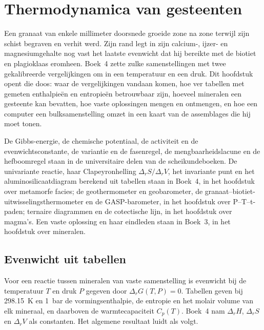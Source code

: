 \chapter{Thermodynamica van gesteenten}\label{ch:b3:petrological-thermodynamics}

Een granaat van enkele millimeter doorsnede groeide zone na zone terwijl zijn schist
begraven en verhit werd. Zijn rand legt in zijn calcium-, ijzer- en magnesiumgehalte
nog vast het laatste evenwicht dat hij bereikte met de biotiet en plagioklaas eromheen.
Boek~4 zette zulke samenstellingen met twee gekalibreerde vergelijkingen om in een
temperatuur en een druk. Dit hoofdstuk opent die doos: waar de vergelijkingen vandaan
komen, hoe ver tabellen met gemeten enthalpieën en entropieën betrouwbaar zijn, hoeveel
mineralen een gesteente kan bevatten, hoe vaste oplossingen mengen en ontmengen, en
hoe een computer een bulksamenstelling omzet in een kaart van de assemblages
die hij moet tonen.

\begin{recall}
De Gibbs-energie, de chemische potentiaal, de activiteit en de
evenwichtsconstante, de variantie en de fasenregel, de mengbaarheidslacune en de
hefboomregel staan in de universitaire delen van de scheikundeboeken. De univariante
reactie, haar Clapeyronhelling $\Delta_rS/\Delta_rV$, het invariante punt en het
aluminosilicaatdiagram berekend uit tabellen staan in Boek~4, in het hoofdstuk over
metamorfe facies; de geothermometer en geobarometer, de
granaat--biotiet-uitwisselingsthermometer en de GASP-barometer, in het hoofdstuk over
P--T--t-paden; ternaire diagrammen en de cotectische lijn, in het hoofdstuk over magma's.
Een vaste oplossing en haar eindleden staan in Boek~3, in het hoofdstuk over
mineralen.
\end{recall}

\section{Evenwicht uit tabellen}\label{sec:b3:petrological-thermodynamics:tables}

Voor een reactie tussen mineralen van vaste samenstelling is evenwicht bij de
temperatuur $T$ en druk $P$ gegeven door $\Delta_rG(T, P) = 0$. Tabellen geven bij
\qty{298.15}{K} en \qty{1}{bar} de vormingsenthalpie, de entropie en het molair
volume van elk mineraal, en daarboven de warmtecapaciteit $C_p(T)$. Boek~4 nam
$\Delta_rH$, $\Delta_rS$ en $\Delta_rV$ als constanten. Het algemene resultaat
luidt als volgt.

